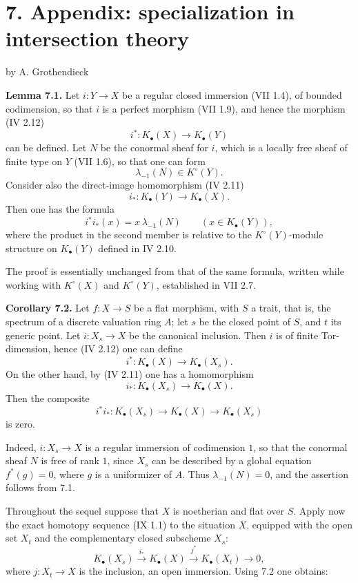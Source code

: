 \documentclass[11pt]{article}
\begin{document}
\section*{7. Appendix: specialization in intersection theory}
\begin{center}
by A. Grothendieck
\end{center}

\textbf{Lemma 7.1.} Let \(i:Y\to X\) be a regular closed immersion (VII 1.4), of bounded codimension, so that \(i\) is a perfect morphism (VII 1.9), and hence the morphism (IV 2.12)
\[
 i^*:K_\bullet(X)\longrightarrow K_\bullet(Y)
\]
can be defined. Let \(N\) be the conormal sheaf for \(i\), which is a locally free sheaf of finite type on \(Y\) (VII 1.6), so that one can form
\[
 \lambda_{-1}(N)\in K^\circ(Y).
\]
Consider also the direct-image homomorphism (IV 2.11)
\[
 i_*:K_\bullet(Y)\longrightarrow K_\bullet(X).
\]
Then one has the formula
\[
 i^*i_*(x)=x\,\lambda_{-1}(N)\qquad (x\in K_\bullet(Y)),
\]
where the product in the second member is relative to the \(K^\circ(Y)\)-module structure on \(K_\bullet(Y)\) defined in IV 2.10.

The proof is essentially unchanged from that of the same formula, written while working with \(K^\circ(X)\) and \(K^\circ(Y)\), established in VII 2.7.

\textbf{Corollary 7.2.} Let \(f:X\to S\) be a flat morphism, with \(S\) a trait, that is, the spectrum of a discrete valuation ring \(A\); let \(s\) be the closed point of \(S\), and \(t\) its generic point. Let \(i:X_s\to X\) be the canonical inclusion. Then \(i\) is of finite Tor-dimension, hence (IV 2.12) one can define
\[
 i^*:K_\bullet(X)\longrightarrow K_\bullet(X_s).
\]
On the other hand, by (IV 2.11) one has a homomorphism
\[
 i_*:K_\bullet(X_s)\longrightarrow K_\bullet(X).
\]
Then the composite
\[
 i^*i_*:K_\bullet(X_s)\longrightarrow K_\bullet(X)\longrightarrow K_\bullet(X_s)
\]
is zero.

Indeed, \(i:X_s\to X\) is a regular immersion of codimension \(1\), so that the conormal sheaf \(N\) is free of rank \(1\), since \(X_s\) can be described by a global equation \(f^*(g)=0\), where \(g\) is a uniformizer of \(A\). Thus \(\lambda_{-1}(N)=0\), and the assertion follows from 7.1.

Throughout the sequel suppose that \(X\) is noetherian and flat over \(S\). Apply now the exact homotopy sequence (IX 1.1) to the situation \(X\), equipped with the open set \(X_t\) and the complementary closed subscheme \(X_s\):
\[
 K_\bullet(X_s)\xrightarrow{i_*}K_\bullet(X)\xrightarrow{j^*}K_\bullet(X_t)\longrightarrow0,
\]
where \(j:X_t\to X\) is the inclusion, an open immersion. Using 7.2 one obtains:
\end{document}

